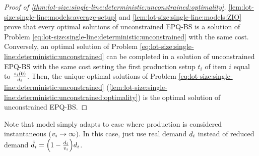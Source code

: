 


\begin{proof}[Proof of \cref{thm:lot-size:single-line:deterministic:unconstrained:optimality}]
\cref{lem:lot-size:single-line:models:average-setup} and \cref{lem:lot-size:single-line:models:ZIO} prove that every optimal solutions of unconstrained EPQ-BS is a solution of Problem \ref{eq:lot-size:single-line:deterministic:unconstrained} with the same cost.
Conversely, an optimal solution of Problem \ref{eq:lot-size:single-line:deterministic:unconstrained} can be completed in a solution of unconstrained EPQ-BS with the same cost setting the first production setup $t_i$ of item $i$ equal to $\frac{s_i(0)}{d_i}$.
Then, the unique optimal solutions of Problem \ref{eq:lot-size:single-line:deterministic:unconstrained} (\cref{lem:lot-size:single-line:deterministic:unconstrained:optimality}) is the optimal solution of unconstrained EPQ-BS.
\end{proof}


\medskip


Note that model simply adapts to case where production is considered instantaneous (\ie $v_i\rightarrow\infty$).
In this case, just use real demand $d_i$ instead of reduced demand $\bar{\demand}_i=\bracket{1-\frac{\demand_i}{\rate_i}}\demand_i$.










